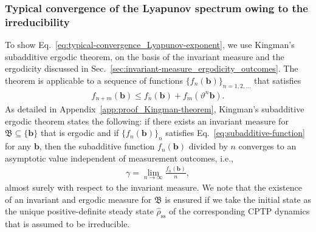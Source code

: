 \documentclass[preprint,pteplogo]{ptephy_v2}%
\numberwithin{equation}{section}
\theoremstyle{definition}
\begin{document}
\subsubsection{Typical convergence of the Lyapunov spectrum owing to the irreducibility}
\label{sec:typical-convergence_Lyapunov-spectrum}
To show Eq.~\eqref{eq:typical-convergence_Lyapunov-exponent}, we use Kingman's subadditive ergodic theorem, on the basis of the invariant measure and the ergodicity discussed in Sec.~\ref{sec:invariant-measure_ergodicity_outcomes}. 
The theorem is applicable to a sequence of functions $\{f_n(\bm{b})\}_{n=1,2,\ldots}$ that satisfies
\begin{align}
    f_{n+m}(\bm{b}) \leq f_n(\bm{b})+f_m(\vartheta^n\bm{b}).
    \label{eq:subadditive-function}
\end{align}
As detailed in Appendix~\ref{app:proof_Kingman-theorem}, Kingman's subadditive ergodic theorem states the following: if there exists an invariant measure for $\mathfrak{B}\subseteq\{\bm{b}\}$ that is ergodic and if $\{f_n(\bm{b})\}_n$ satisfies Eq.~\eqref{eq:subadditive-function} for any $\bm{b}$, then the subadditive function $f_n(\bm{b})$ divided by $n$ converges to an asymptotic value independent of measurement outcomes, i.e.,
\begin{align}
    \gamma=\lim_{n\rightarrow\infty}
    \frac{f_n(\bm{b})}{n},
    \label{eq:Kingman-theorem}
\end{align}
almost surely with respect to the invariant measure. 
We note that the existence of an invariant and ergodic measure for $\mathfrak{B}$ is ensured if we take the initial state as the unique positive-definite steady state $\hat{\rho}_\mathrm{ss}$ of the corresponding CPTP dynamics that is assumed to be irreducible.
\end{document}

